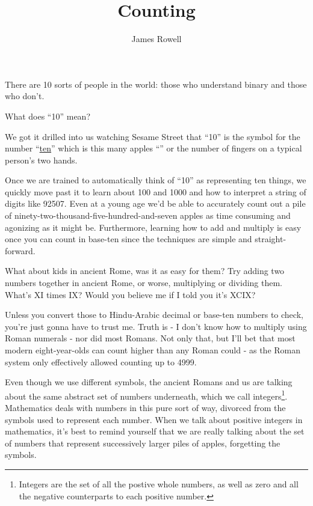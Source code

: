 \documentclass{article}
\title{Counting}
\author{James Rowell}
\begin{document}
\maketitle
\begin{em}
\centerline{\small{}There are 10 sorts of people in the world: those who understand binary and those who don't.}
\end{em}
\bigskip

What does ``10'' mean?

We got it drilled into us watching Sesame Street that ``10'' is the symbol for the number
``\href{https://youtu.be/YcRBEqq-tGY?list=PLjBV4gvZoIcwHfhAWBmP6i7vEuqU6Q6vE}{ten}''
which is this many apples
``\faApple{}\faApple{}\faApple{}\faApple{}\faApple{}\faApple{}\faApple{}\faApple{}\faApple{}\faApple{}''
or the number of fingers on a typical person's two hands.

Once we are trained to automatically think
of ``10'' as representing ten things, we quickly move past it to learn about 100 and 1000
and how to interpret a string of digits 
like 92507. Even at a young age we'd
be able to accurately count out a pile of
ninety-two-thousand-five-hundred-and-seven apples as time consuming and agonizing as it might be.
Furthermore, learning how to add and multiply is easy once you can count in
base-ten since the techniques are simple and straight-forward.

What about kids in ancient Rome, was it as easy for them?
Try adding two numbers together in ancient Rome, or worse,
multiplying or dividing them.
What's XI times IX? Would you believe me if I told
you it's XCIX?

Unless you convert those to Hindu-Arabic decimal or base-ten numbers to check,
you're just gonna have to trust me.
Truth is - I don't know how to multiply using Roman
numerals - nor did most Romans. Not only that,
but I'll bet that most modern eight-year-olds 
can count higher than any Roman could - as the
Roman system only effectively allowed counting up to 4999.

Even though we use different symbols, the ancient Romans and us
are talking about the same abstract set of numbers underneath,
which we call integers\footnote{Integers are 
the set of all the postive whole numbers, as well as zero and all the negative counterparts to each positive number.
}.
Mathematics deals with numbers in this pure sort of way, divorced from the symbols
used to represent each number.
When we talk about positive integers in mathematics, it's best to remind yourself
that we are really talking about the set of numbers 
that represent successively larger piles of apples, forgetting the symbols.
\end{document}
